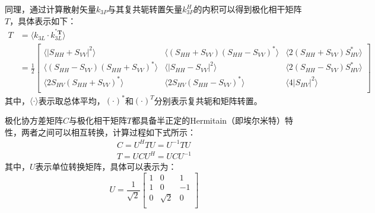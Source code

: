 同理，通过计算散射矢量$k_{3P}$与其复共轭转置矢量$k_{3P}^{H}$的内积可以得到极化相干矩阵$T$，具体表示如下：
\begin{equation}
  \label{eq:T}
  \begin{aligned}
    T & =\left. \langle k_{3L}\cdot k_{3L}^{^*\boldsymbol{T}} \right. \rangle                                                                                                                                                                                                                  \\
      & =\frac{1}{2}\left[ \begin{matrix}
                               \langle \left| S_{HH}+S_{VV} \right|^2\rangle                                               & \left. \langle \left( S_{HH}+S_{VV} \right) \left( S_{HH}-S_{VV} \right) ^* \right. \rangle & \left. \langle 2\left( S_{HH}+S_{VV} \right) S_{HV}^{*} \right. \rangle \\
                               \left. \langle \left( S_{HH}-S_{VV} \right) \left( S_{HH}+S_{VV} \right) ^* \right. \rangle & \left. \langle \left| S_{HH}-S_{VV} \right|^2 \right. \rangle                               & \left. \langle 2\left( S_{HH}-S_{VV} \right) S_{HV}^{*} \right. \rangle \\
                               \left. \langle 2S_{HV}\left( S_{HH}+S_{VV} \right) ^* \right. \rangle                       & \left. \langle 2S_{HV}\left( S_{HH}-S_{VV} \right) ^* \right. \rangle                       & \left. \langle 4\left| S_{HV} \right|^2 \right. \rangle                 \\
                             \end{matrix} \right]
  \end{aligned}
\end{equation}
其中，$\langle \cdot \rangle$表示取总体平均，$(\cdot)^*$和$(\cdot)^T$分别表示复共轭和矩阵转置。

极化协方差矩阵$C$与极化相干矩阵$T$都具备半正定的Hermitain（即埃尔米特）特性，两者之间可以相互转换，计算过程如下式所示：
\begin{gather}
  C=U^H T U=U^{-1} T U \\
  T=U C U^H=U C U^{-1}
\end{gather}
其中，$U$表示单位转换矩阵，具体可以表示为：
\begin{equation}
  U=\frac{1}{\sqrt{2}}\left[ \begin{matrix}
      1 & 0        & 1  \\
      1 & 0        & -1 \\
      0 & \sqrt{2} & 0  \\
    \end{matrix} \right]
\end{equation}

